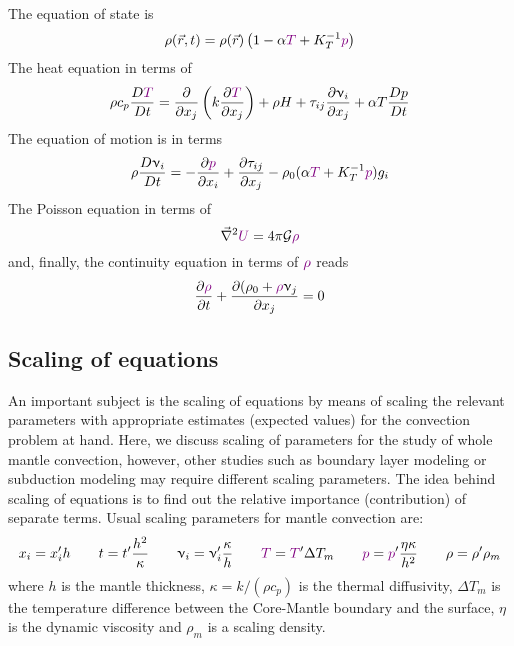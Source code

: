 The equation of state is
\begin{equation}
\rho(\vec{r},t) = \rho(\vec{r}) \left(1-\alpha {\color{violet} T} + K_T^{-1} {\color{violet}p} \right) 
\label{eq:md71a}
\end{equation}
The heat equation in terms of 
\begin{equation}
\rho c_p \frac{D {\color{violet} T}}{Dt} = \frac{\partial }{\partial x_j} 
\left( k \frac{\partial {\color{violet}T}}{\partial x_j}  \right)
+ \rho H + \tau_{ij}\frac{\partial \upnu_i}{\partial x_j} + \alpha T \frac{Dp}{Dt}
\label{eq:md71b}
\end{equation}
The equation of motion is in terms
\begin{equation}
\rho \frac{D \upnu_i}{Dt} = -\frac{\partial {\color{violet}p}}{\partial x_i}
+\frac{\partial \tau_{ij}}{\partial x_j}
-\rho_0 (\alpha {\color{violet} T} + K_T^{-1} {\color{violet}p}) g_i
\label{eq:md71c}
\end{equation}
The Poisson equation in terms of
\begin{equation}
\vec\nabla^2 {\color{violet} U} = 4 \pi {\cal G} {\color{violet} \rho}
\label{eq:md71d}
\end{equation}
and, finally, the continuity equation in terms of ${\color{violet}\rho}$ reads
\begin{equation}
\frac{\partial {\color{violet}\rho} }{\partial t} + 
\frac{\partial (\rho_0 + {\color{violet}\rho} \upnu_j }{\partial x_j} =0
\label{eq:md71e}
\end{equation}



\subsection{Scaling of equations}


An important subject is the scaling of equations by means of scaling the relevant
parameters with appropriate estimates (expected values) for the convection problem at
hand. Here, we discuss scaling of parameters for the study of whole mantle convection,
however, other studies such as boundary layer modeling or subduction modeling may
require different scaling parameters. The idea behind scaling of equations is to find out
the relative importance (contribution) of separate terms. Usual scaling parameters for
mantle convection are:
\[
x_i = x_i' h
\qquad
t = t' \frac{h^2}{\kappa}
\qquad
\upnu_i = \upnu_i' \frac{\kappa}{h} 
\qquad
{\color{violet} T} = {\color{violet} T}' \Delta T_m
\qquad
{\color{violet} p} = {\color{violet} p}' \frac{\eta \kappa}{h^2}
\qquad
\rho = \rho' \rho_m 
\]
where $h$ is the mantle thickness, $\kappa=k/(\rho c_p)$
is the thermal diffusivity, $\Delta T_m$ is the
temperature difference between the Core-Mantle boundary and the surface,
$\eta$ is the dynamic viscosity and $\rho_m$ is a scaling density.

